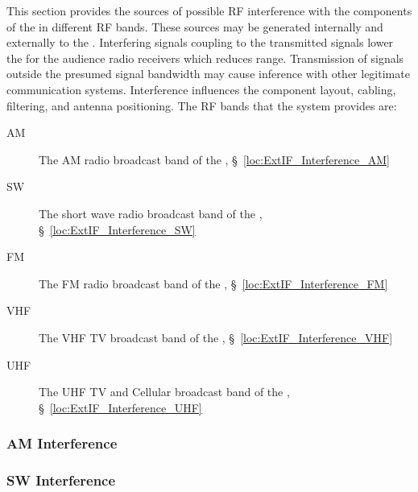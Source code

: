 This section provides the sources of possible RF interference with the components of the \ThisSys in different RF bands.
These sources may be generated internally and externally to the \ThisSys. Interfering signals coupling to the transmitted signals lower the \SNR for the audience radio receivers which reduces range. Transmission of signals outside the presumed signal bandwidth may cause inference with other legitimate communication systems. Interference influences the \ThisSys component layout, cabling, filtering, and antenna positioning.
The RF bands that the system provides are:
\begin{description}
	\item[AM] The AM radio broadcast band of the \ThisSys, \S~\ref{loc:ExtIF_Interference_AM}
	\item[SW] The short wave radio broadcast band of the \ThisSys, \S~\ref{loc:ExtIF_Interference_SW}
	\item[FM] The FM radio broadcast band of the \ThisSys, \S~\ref{loc:ExtIF_Interference_FM}
	\item[VHF] The VHF TV broadcast band of the \ThisSys, \S~\ref{loc:ExtIF_Interference_VHF}
	\item[UHF] The UHF TV and Cellular broadcast band of the \ThisSys, \S~\ref{loc:ExtIF_Interference_UHF}
\end{description}

\KNEADSUBSUBSECTIONNEWPAGE
\subsubsection{AM Interference}
\label{loc:ExtIF_Interference_AM}


%

\KNEADSUBSUBSECTIONNEWPAGE
\subsubsection{SW Interference}
\label{loc:ExtIF_Interference_SW}

